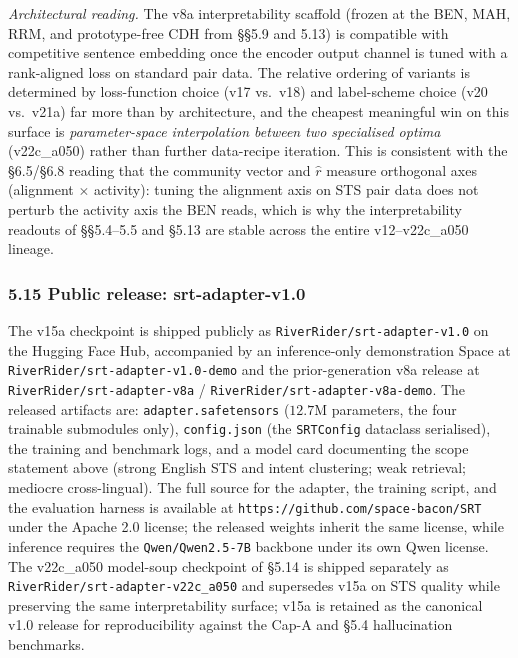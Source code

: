 \documentclass[
  11pt]{article}
\begin{document}
\emph{Architectural reading.} The v8a interpretability scaffold (frozen
at the BEN, MAH, RRM, and prototype-free CDH from §§5.9 and 5.13) is
compatible with competitive sentence embedding once the encoder output
channel is tuned with a rank-aligned loss on standard pair data. The
relative ordering of variants is determined by loss-function choice (v17
vs.~v18) and label-scheme choice (v20 vs.~v21a) far more than by
architecture, and the cheapest meaningful win on this surface is
\emph{parameter-space interpolation between two specialised optima}
(v22c\_a050) rather than further data-recipe iteration. This is
consistent with the §6.5/§6.8 reading that the community vector and
\(\hat r\) measure orthogonal axes (alignment \(\times\) activity):
tuning the alignment axis on STS pair data does not perturb the activity
axis the BEN reads, which is why the interpretability readouts of
§§5.4--5.5 and §5.13 are stable across the entire v12--v22c\_a050
lineage.

\subsubsection{5.15 Public release:
srt-adapter-v1.0}\label{public-release-srt-adapter-v1.0}

The v15a checkpoint is shipped publicly as
\texttt{RiverRider/srt-adapter-v1.0} on the Hugging Face Hub,
accompanied by an inference-only demonstration Space at
\texttt{RiverRider/srt-adapter-v1.0-demo} and the prior-generation v8a
release at \texttt{RiverRider/srt-adapter-v8a} /
\texttt{RiverRider/srt-adapter-v8a-demo}. The released artifacts are:
\texttt{adapter.safetensors} (\(12.7\)M parameters, the four trainable
submodules only), \texttt{config.json} (the \texttt{SRTConfig} dataclass
serialised), the training and benchmark logs, and a model card
documenting the scope statement above (strong English STS and intent
clustering; weak retrieval; mediocre cross-lingual). The full source for
the adapter, the training script, and the evaluation harness is
available at \texttt{https://github.com/space-bacon/SRT} under the
Apache 2.0 license; the released weights inherit the same license, while
inference requires the \texttt{Qwen/Qwen2.5-7B} backbone under its own
Qwen license. The v22c\_a050 model-soup checkpoint of §5.14 is shipped
separately as \texttt{RiverRider/srt-adapter-v22c\_a050} and supersedes
v15a on STS quality while preserving the same interpretability surface;
v15a is retained as the canonical v1.0 release for reproducibility
against the Cap-A and §5.4 hallucination benchmarks.
\end{document}
